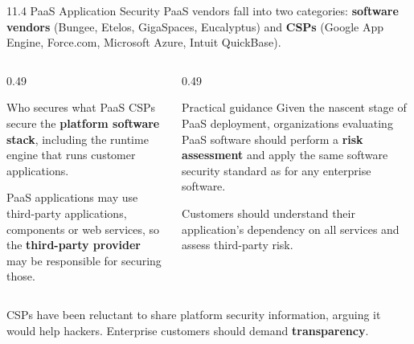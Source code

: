 \documentclass[11pt,aspectratio=169]{beamer}
\newcommand{\kw}[1]{\textbf{\color{accent}#1}}
\begin{document}
\begin{frame}{11.4 PaaS Application Security}
  \small
  PaaS vendors fall into two categories: \kw{software vendors}
  (Bungee, Etelos, GigaSpaces, Eucalyptus) and \kw{CSPs}
  (Google App Engine, Force.com, Microsoft Azure, Intuit QuickBase).
  \vspace{0.8em}

  \begin{columns}[T,onlytextwidth]
    \begin{column}{0.49\textwidth}
      \begin{block}{Who secures what}
        \scriptsize
        PaaS CSPs secure the \kw{platform software stack}, including the
        runtime engine that runs customer applications.
        \vspace{0.4em}

        PaaS applications may use third-party applications, components or web
        services, so the \kw{third-party provider} may be responsible for
        securing those.
      \end{block}
    \end{column}
    \begin{column}{0.49\textwidth}
      \begin{block}{Practical guidance}
        \scriptsize
        Given the nascent stage of PaaS deployment, organizations evaluating
        PaaS software should perform a \kw{risk assessment} and apply the same
        software security standard as for any enterprise software.
        \vspace{0.4em}

        Customers should understand their application's dependency on all
        services and assess third-party risk.
      \end{block}
    \end{column}
  \end{columns}
  \vspace{0.8em}

  {\footnotesize\color{warmred}
  CSPs have been reluctant to share platform security information, arguing it
  would help hackers. Enterprise customers should demand \textbf{transparency}.}
\end{frame}
\end{document}
